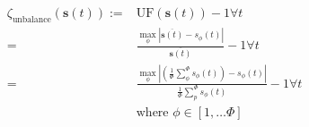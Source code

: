 \begin{equation}
	\begin{split}
		\zeta_\text{unbalance}(\textbf{s}(t)):=&\text{UF}(\textbf{s}(t)) - 1 \forall t\\
		=&\frac{\max_\phi\left|\overline{\textbf{s}(t)} - s_\phi(t)\right|}{\overline{\textbf{s}(t)}} - 1 \forall t\\
		=&\frac{\max_\phi\left|\left(\frac{1}{\Phi}\sum_\phi^\Phi{s_\phi(t)}\right) - s_\phi(t)\right|}{\frac{1}{\Phi}\sum_p^\Phi{s_\phi(t)}} - 1 \forall t\\
		&\text{where } \phi \in [1, \dots \Phi]
	\end{split}
	\label{ch1:equ:unbalance-cost}
\end{equation}
